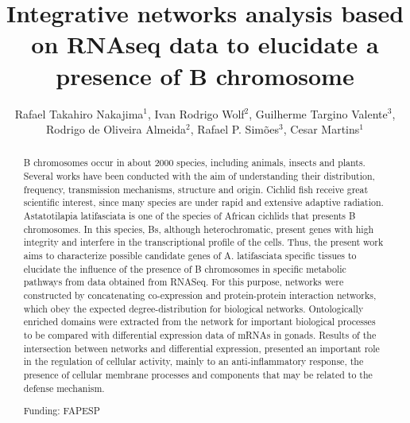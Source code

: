 \documentclass[twoside]{article}
\title{\vspace{-15mm}\fontsize{24pt}{10pt}\selectfont\textbf{Integrative networks analysis based on RNAseq data to elucidate a presence of B chromosome}} %
\author{Rafael Takahiro Nakajima$^1$, Ivan Rodrigo Wolf$^2$, Guilherme Targino Valente$^3$, Rodrigo de Oliveira Almeida$^2$, Rafael P. Sim\~oes$^3$, Cesar Martins$^1$}
\affil{1 IBB-UNESP\\ 2 FCA-UNESP\\ 3 UNESP - STATE USP\\ }
\date{}
\begin{document}
\maketitle %

\thispagestyle{fancy} %


\begin{abstract}
B chromosomes occur in about 2000 species, including animals, insects and plants. Several works have been conducted with the aim of understanding their distribution, frequency, transmission mechanisms, structure and origin. Cichlid fish receive great scientific interest, since many species are under rapid and extensive adaptive radiation. Astatotilapia latifasciata is one of the species of African cichlids that presents B chromosomes. In this species, Bs, although heterochromatic, present genes with high integrity and interfere in the transcriptional profile of the cells. Thus, the present work aims to characterize possible candidate genes of A. latifasciata specific tissues to elucidate the influence of the presence of B chromosomes in specific metabolic pathways from data obtained from RNASeq. For this purpose, networks were constructed by concatenating co-expression and protein-protein interaction networks, which obey the expected degree-distribution for biological networks. Ontologically enriched domains were extracted from the network for important biological processes to be compared with differential expression data of mRNAs in gonads. Results of the intersection between networks and differential expression, presented an important role in the regulation of cellular activity, mainly to an anti-inflammatory response, the presence of cellular membrane processes and components that may be related to the defense mechanism.

Funding: FAPESP
\end{abstract}
\end{document}
